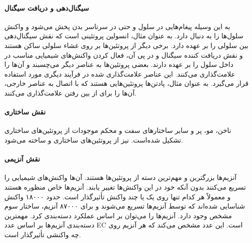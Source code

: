 \paragraph{سیگنال‌دهی و دریافت سیگنال}
به این وسیله پیغام‌هایی در سلول و حتی در سرتاسر بدن پخش می‌شود و واکنش سلول‌ها را به دنبال دارد. به عنوان مثال، انسولین پروتئینی است که نقش سیگنال‌دهی بین سلولی را بر عهده دارد. برخی دیگر از پروتئین‌ها بر روی غشاء سلولی ساکن هستند و نقش دریافت کننده سیگنال و در پی آن، فعال کردن واکنش‌های شیمیایی مناسب در داخل سلول را بر عهده دارند. بعضی پروتئین‌ها به عناصر دیگر می‌چسبند و آن‌ها را علامت‌گذاری می‌کنند. این عناصر علامت‌گذاری شده در فرآیند دیگری مورد استفاده قرار می‌گیرد. به عنوان مثال، پادتن‌ها پروتئین‌هایی هستند که با اتصال به عناصر خارجی، آن‌ها را برای از بین رفتن علامت‌گذاری می‌کنند.

\paragraph{نقش ساختاری}
ناخن، مو، پر و سایر ساختارهای سفت و محکم موجودات از پروتئین‌های ساختاری تشکیل شده‌است.  نیز از پروتئین‌های ساختاری  و  ساخته می‌شود.

\paragraph{نقش آنزیمی} 
آنزیم‌ها بزرگترین و مهم‌ترین دسته از پروتئین‌ها هستند. آن‌ها واکنش‌های شیمیایی را تسریع می‌کنند بدون آنکه خود در این واکنش‌ها تغییر یابند. آنزیم‌ها خاص منظوره هستند و معمولاً  هر کدام تنها روی یک یا چند واکنش تأثیرگذار است. حدود ۱۸۰۰۰ واکنش شناسایی شده‌اند که توسط آنزیم‌ها تسریع می‌شوند و برای ۸۷۰۰۰ آنزیم، ساختار سوم مشخص وجود دارد. آنزیم‌ها را می‌توان بر اساس عملکرد دسته‌بندی کرد. مهمترین دسته‌بندی آنزیم‌ها بر اساس عدد EC است. این عدد مشخص می‌کند که هر آنزیم روی چه واکنشی تأثیرگذار است.


